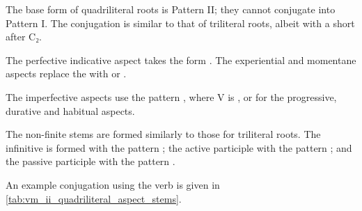 \documentclass[grammar]{subfiles}
\begin{document}
The base form of quadriliteral roots is Pattern II; they cannot conjugate into
Pattern I.  The conjugation is similar to that of triliteral roots, albeit with
a short  after C₂.

The perfective indicative aspect takes the form . The
experiential and momentane aspects replace the  with  or .

The imperfective aspects use the pattern , where V is
,  or  for the progressive, durative and habitual aspects.

The non-finite stems are formed similarly to those for triliteral roots.  The
infinitive is formed with the pattern ; the active participle
with the pattern ; and the passive participle with the pattern
.

An example conjugation using the verb  is given in
\cref{tab:vm_ii_quadriliteral_aspect_stems}. 

\begin{table}[h!]\small\capstart
  \centering
  \\
  \caption{Pattern II quadriliteral stems\label{tab:vm_ii_quadriliteral_aspect_stems}}
\end{table}
\end{document}
